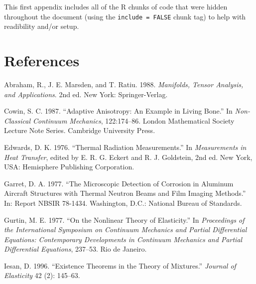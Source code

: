 \documentclass[msc,numbers]{coppe}
\begin{document}
  This first appendix includes all of the R chunks of code that were hidden throughout the document (using the \texttt{include\ =\ FALSE} chunk tag) to help with readibility and/or setup.
  
  \backmatter
  
  
  
  \hypertarget{references}{%
  \chapter*{References}\label{references}}
  
  
  \noindent
  
  \setlength{\parindent}{-0.20in}
  \setlength{\leftskip}{0.20in}
  \setlength{\parskip}{8pt}
  
  \hypertarget{refs}{}
  \leavevmode\hypertarget{ref-book-example}{}%
  Abraham, R., J. E. Marsden, and T. Ratiu. 1988. \emph{Manifolds, Tensor Analysis, and Applications}. 2nd ed. New York: Springer-Verlag.
  
  \leavevmode\hypertarget{ref-incollection-example}{}%
  Cowin, S. C. 1987. ``Adaptive Anisotropy: An Example in Living Bone.'' In \emph{Non-Classical Continuum Mechanics}, 122:174--86. London Mathematical Society Lecture Note Series. Cambridge University Press.
  
  \leavevmode\hypertarget{ref-inbook-example}{}%
  Edwards, D. K. 1976. ``Thermal Radiation Measurements.'' In \emph{Measurements in Heat Transfer}, edited by E. R. G. Eckert and R. J. Goldstein, 2nd ed. New York, USA: Hemisphere Publishing Corporation.
  
  \leavevmode\hypertarget{ref-techreport-exampleIn}{}%
  Garret, D. A. 1977. ``The Microscopic Detection of Corrosion in Aluminum Aircraft Structures with Thermal Neutron Beams and Film Imaging Methods.'' In: Report NBSIR 78-1434. Washington, D.C.: National Bureau of Standards.
  
  \leavevmode\hypertarget{ref-inproceedings-example}{}%
  Gurtin, M. E. 1977. ``On the Nonlinear Theory of Elasticity.'' In \emph{Proceedings of the International Symposium on Continuum Mechanics and Partial Differential Equations: Contemporary Developments in Continuum Mechanics and Partial Differential Equations}, 237--53. Rio de Janeiro.
  
  \leavevmode\hypertarget{ref-article-example}{}%
  Iesan, D. 1996. ``Existence Theorems in the Theory of Mixtures.'' \emph{Journal of Elasticity} 42 (2): 145--63.
  
\end{document}
